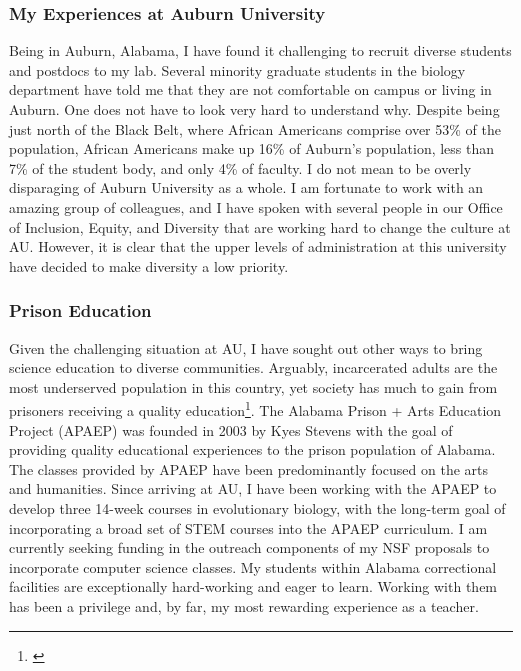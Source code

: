 \subsubsection*{My Experiences at Auburn University}
Being in Auburn, Alabama, I have found it challenging to recruit diverse
students and postdocs to my lab.
Several minority graduate students in the biology department have told me that
they are not comfortable on campus or living in Auburn.
One does not have to look very hard to understand why.
Despite being just north of the Black Belt,
where African Americans comprise over 53\% of the population,
African Americans make up
16\% of Auburn's population, less than 7\% of the student body,
and only 4\% of faculty.
I do not mean to be overly disparaging of Auburn University as a whole.
I am fortunate to work with an amazing group of colleagues, and
I have spoken with several people in our Office of Inclusion, Equity, and
Diversity that are working hard to change the culture at AU.
However, it is clear that the upper levels of administration at this university
have decided to make diversity a low priority.


\subsubsection*{Prison Education}
Given the challenging situation at AU, I have sought out other ways to bring
science education to diverse communities.
Arguably, incarcerated adults are the most underserved population in this country,
yet society has much to gain from prisoners receiving a quality
education\footnote{\label{Vacca04}}.
The Alabama Prison + Arts Education Project (APAEP) was founded in 2003 by Kyes
Stevens with the goal of providing quality
educational experiences to the prison population of Alabama.
The classes provided by APAEP have been predominantly focused on the
arts and humanities.
Since arriving at AU, I have been working with the APAEP to develop three
14-week courses in evolutionary biology, with the long-term goal of
incorporating a broad set of STEM courses into the APAEP curriculum.
I am currently seeking funding in the outreach components of my NSF proposals
to incorporate computer science classes.
My students within Alabama correctional facilities are exceptionally
hard-working and eager to learn.
Working with them has been a privilege and, by far, my most rewarding
experience as a teacher.
